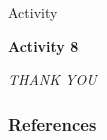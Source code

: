 \documentclass{bredelebeamer}
\begin{document}
\begin{frame}[fragile]{Activity}
\begin{center}
{\Large \textbf{Activity 8}}
\end{center}

\end{frame}
\begin{frame}
\centering
\emph{THANK YOU}
\end{frame}

\begin{frame}[t, allowframebreaks]

\frametitle{References}

\end{frame} 
\end{document}
